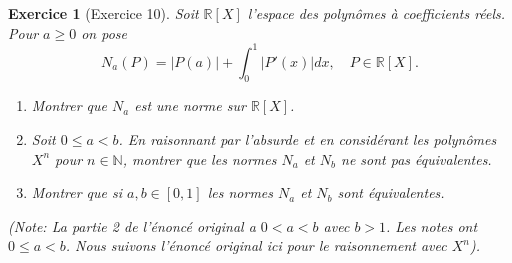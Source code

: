 \documentclass{article}
\newtheorem{exercise}{Exercice} %
\begin{document}
\begin{exercise}[Exercice 10]
Soit $\mathbb{R}[X]$ l'espace des polynômes à coefficients réels. Pour $a \ge 0$ on pose
\[ N_a(P) = |P(a)| + \int_0^1 |P'(x)| dx, \quad P \in \mathbb{R}[X]. \]
\begin{enumerate}
    \item Montrer que $N_a$ est une norme sur $\mathbb{R}[X]$.
    \item Soit $0 \le a < b$. En raisonnant par l'absurde et en considérant les polynômes $X^n$ pour $n \in \mathbb{N}$, montrer que les normes $N_a$ et $N_b$ ne sont pas équivalentes.
    \item Montrer que si $a, b \in [0, 1]$ les normes $N_a$ et $N_b$ sont équivalentes.
\end{enumerate}
(Note: La partie 2 de l'énoncé original a $0 < a < b$ avec $b > 1$. Les notes ont $0 \le a < b$. Nous suivons l'énoncé original ici pour le raisonnement avec $X^n$).
\end{exercise}
\end{document}
